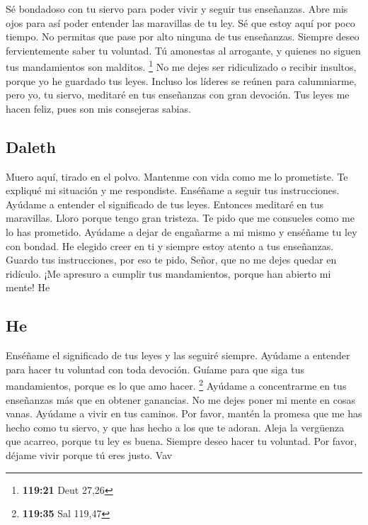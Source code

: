  Sé bondadoso con tu siervo para poder vivir y seguir tus
enseñanzas.  Abre mis ojos para así poder entender las
maravillas de tu ley.  Sé que estoy aquí por poco tiempo.
No permitas que pase por alto ninguna de tus enseñanzas. 
Siempre deseo fervientemente saber tu voluntad.  Tú
amonestas al arrogante, y quienes no siguen tus mandamientos son
malditos. \footnote{\textbf{119:21} Deut 27,26}  No me
dejes ser ridiculizado o recibir insultos, porque yo he guardado tus
leyes.  Incluso los líderes se reúnen para calumniarme,
pero yo, tu siervo, meditaré en tus enseñanzas con gran devoción.
 Tus leyes me hacen feliz, pues son mis consejeras sabias.

\hypertarget{daleth}{%
\subsection{Daleth}\label{daleth}}

 Muero aquí, tirado en el polvo. Mantenme con vida como me
lo prometiste.  Te expliqué mi situación y me respondiste.
Enséñame a seguir tus instrucciones.  Ayúdame a entender el
significado de tus leyes. Entonces meditaré en tus maravillas.
 Lloro porque tengo gran tristeza. Te pido que me consueles
como me lo has prometido.  Ayúdame a dejar de engañarme a
mi mismo y enséñame tu ley con bondad.  He elegido creer en
ti y siempre estoy atento a tus enseñanzas.  Guardo tus
instrucciones, por eso te pido, Señor, que no me dejes quedar en
ridículo.  ¡Me apresuro a cumplir tus mandamientos, porque
han abierto mi mente! He

\hypertarget{he}{%
\subsection{He}\label{he}}

 Enséñame el significado de tus leyes y las seguiré
siempre.  Ayúdame a entender para hacer tu voluntad con
toda devoción.  Guíame para que siga tus mandamientos,
porque es lo que amo hacer. \footnote{\textbf{119:35} Sal 119,47}
 Ayúdame a concentrarme en tus enseñanzas más que en
obtener ganancias.  No me dejes poner mi mente en cosas
vanas. Ayúdame a vivir en tus caminos.  Por favor, mantén
la promesa que me has hecho como tu siervo, y que has hecho a los que te
adoran.  Aleja la vergüenza que acarreo, porque tu ley es
buena.  Siempre deseo hacer tu voluntad. Por favor, déjame
vivir porque tú eres justo. Vav

